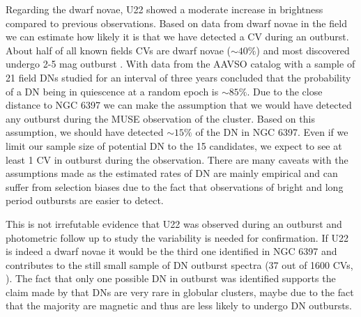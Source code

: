  Regarding the dwarf novae, U22 showed a moderate increase in brightness compared to previous observations. Based on data from dwarf novae in the field we can estimate how likely it is that we have detected a CV during an outburst. About half of all known fields CVs are dwarf novae ($\sim 40 \%$) and most discovered undergo 2-5 mag outburst \citep{2001PASP..113..764D,warner_cataclysmic_2003}. With data from the AAVSO catalog with a sample of 21 field DNs studied for an interval of three years \cite{Szkody_21DN_1984} concluded that the probability of a DN being in quiescence at a random epoch is $\sim 85 \%$. Due to the close distance to NGC 6397 we can make the assumption that we would have detected any outburst during the MUSE observation of the cluster. Based on this assumption, we should have detected $\sim 15 \%$ of the DN in NGC 6397. Even if we limit our sample size of potential DN to the 15 candidates, we expect to see at least 1 CV in outburst during the observation. There are many caveats with the assumptions made as the estimated rates of DN are mainly empirical and can suffer from selection biases due to the fact that observations of bright and long period outbursts are easier to detect. 

This is not irrefutable evidence that U22 was observed during an outburst and photometric follow up to study the variability is needed for confirmation. If U22 is indeed a dwarf novae it would be the third one identified in NGC 6397 \citep{shara_erupting_2005} and contributes to the still small sample of DN outburst spectra (37 out of 1600 CVs, \citealt{2001PASP..113..764D}). The fact that only one possible DN in outburst was identified supports the claim made by \cite{shara_CVsDN_1996} that DNs are very rare in globular clusters, maybe due to the fact that the majority are magnetic and thus are less likely to undergo DN outbursts. \\ 

\begin{comment}

When U10 was first identity the X ray data suggested some magetism but we dont see any evidence in the specta. Tere

The X-ray spectral results suggest nine CVs, all with mod-
erately hard TB spectra and internal self-absorption. The in-
trinsic
N
H
, particularly for U10 (CV6), suggests that these sys-
tems may be dominated by magnetic C



variablity 

Discussion:

    Two population:
        Dynamically vs. primordial?
    Magnetism ?
    X-Ray ?


\end{comment}
